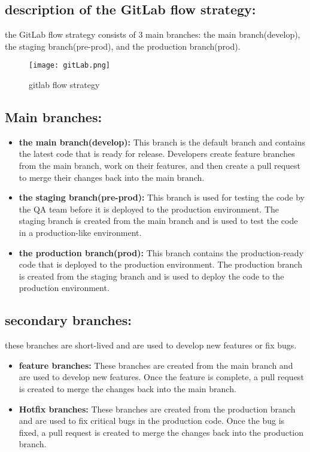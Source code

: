 \subsection*{description of the GitLab flow strategy:}
the GitLab flow strategy consists of 3 main branches: the main branch(develop), the staging branch(pre-prod), and the production branch(prod).

\begin{figure}[htbp]
    \centering
    \texttt{[image: gitLab.png]}
    \caption{gitlab flow strategy}
    \label{fig:gitlab}
\end{figure}

\subsection*{Main branches:}
\begin{itemize}
    \item \textbf{the main branch(develop):} This branch is the default branch and contains the latest code that is ready for release. Developers create feature branches from the main branch, work on their features, and then create a pull request to merge their changes back into the main branch.
    \item \textbf{the staging branch(pre-prod):} This branch is used for testing the code by the QA team before it is deployed to the production environment. The staging branch is created from the main branch and is used to test the code in a production-like environment.
    \item \textbf{the production branch(prod):} This branch contains the production-ready code that is deployed to the production environment. The production branch is created from the staging branch and is used to deploy the code to the production environment.
\end{itemize}
\subsection*{secondary branches:}
these branches are short-lived and are used to develop new features or fix bugs.
\begin{itemize}
    \item \textbf{feature branches:} These branches are created from the main branch and are used to develop new features. Once the feature is complete, a pull request is created to merge the changes back into the main branch.
    \item \textbf{Hotfix branches:} These branches are created from the production branch and are used to fix critical bugs in the production code. Once the bug is fixed, a pull request is created to merge the changes back into the production branch.
\end{itemize}


